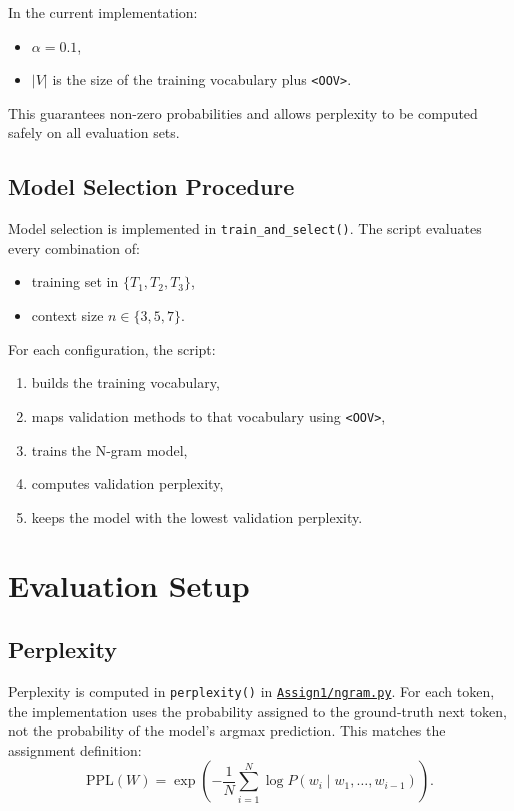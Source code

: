 \documentclass[11pt]{article}
\newcommand{\repoURL}{https://github.com/ABasloe/CSCI555}
\begin{document}
In the current implementation:
\begin{itemize}[leftmargin=*]
  \item \(\alpha = 0.1\),
  \item \(|V|\) is the size of the training vocabulary plus \texttt{<OOV>}.
\end{itemize}

This guarantees non-zero probabilities and allows perplexity to be computed safely on all evaluation sets.

\subsection{Model Selection Procedure}
Model selection is implemented in \texttt{train\_and\_select()}. The script evaluates every combination of:
\begin{itemize}[leftmargin=*]
  \item training set in \(\{T_1, T_2, T_3\}\),
  \item context size \(n \in \{3,5,7\}\).
\end{itemize}

For each configuration, the script:
\begin{enumerate}[leftmargin=*]
  \item builds the training vocabulary,
  \item maps validation methods to that vocabulary using \texttt{<OOV>},
  \item trains the N-gram model,
  \item computes validation perplexity,
  \item keeps the model with the lowest validation perplexity.
\end{enumerate}

\section{Evaluation Setup}

\subsection{Perplexity}
Perplexity is computed in \texttt{perplexity()} in \href{\repoURL/blob/main/Assign1/ngram.py}{\texttt{Assign1/ngram.py}}. For each token, the implementation uses the probability assigned to the ground-truth next token, not the probability of the model's argmax prediction. This matches the assignment definition:
\[
\text{PPL}(W) = \exp\left(-\frac{1}{N}\sum_{i=1}^{N}\log P(w_i \mid w_1,\dots,w_{i-1})\right).
\]
\end{document}
